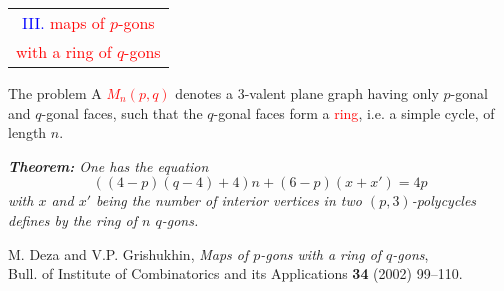 \documentclass[%
pdf,
colorBG,
slideColor,
]{prosper}
\begin{document}
\begin{slide}{}
\begin{center}
{\Huge 
\begin{tabular*}{8cm}{c}
\\[-0.5cm]
\textcolor{blue}{III. }\textcolor{red}{maps of $p$-gons}\\
\textcolor{red}{with a ring}
\textcolor{red}{of $q$-gons}
\end{tabular*}
}
\end{center}
\end{slide}





\begin{slide}{The problem}
A \textcolor{red}{$M_n(p,q)$} denotes a $3$-valent plane graph having only
$p$-gonal and $q$-gonal faces, such that the $q$-gonal faces form a \textcolor{red}{ring}, i.e. a simple cycle, of length $n$.

{\it
{\bf Theorem:} One has the equation
\begin{equation*}
((4-p)(q-4)+4)n+(6-p)(x+x')=4p
\end{equation*}
with $x$ and $x'$ being the number of interior vertices in two $(p,3)$-polycycles defines by the ring of $n$ $q$-gons.
}

\vspace{16mm}

{\scriptsize
M. Deza and V.P. Grishukhin, {\em  Maps of $p$-gons with a ring of $q$-gons},\\[-3mm]
Bull. of Institute of Combinatorics and its Applications {\bf 34} (2002) 99--110.
}
\end{slide}






\end{document}

